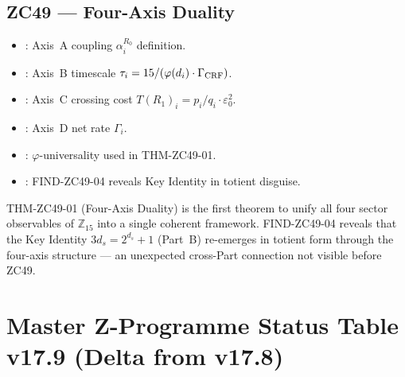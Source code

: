 \documentclass[12pt, a4paper]{article}
\begin{document}
\subsection{ZC49 --- Four-Axis Duality}

\begin{inheritbox}[title={ZC49 Backward Inheritance}]
\begin{itemize}[leftmargin=1.5em]
\item {}: Axis~A coupling
  $\alpha_i^{R_0}$ definition.
\item {}: Axis~B timescale
  $\tau_i = 15/(\varphi(d_i)\cdot\Gamma_{\rm CRF})$.
\item {}: Axis~C crossing cost
  $T(R_1)_i = p_i/q_i \cdot \varepsilon_0^2$.
\item {}: Axis~D net rate $\Gamma_i$.
\item {}: $\varphi$-universality
  used in THM-ZC49-01.
\item {}: FIND-ZC49-04 reveals Key
  Identity in totient disguise.
\end{itemize}
\end{inheritbox}

\begin{conmapbox}[title={ZC49 Synthesis Record}]
THM-ZC49-01 (Four-Axis Duality) is the first theorem to unify all four
sector observables of $\mathbb{Z}_{15}$ into a single coherent framework.
FIND-ZC49-04 reveals that the Key Identity $3d_s = 2^{d_s}+1$ (Part~B)
re-emerges in totient form through the four-axis structure --- an
unexpected cross-Part connection not visible before ZC49.
\end{conmapbox}

\section{Master Z-Programme Status Table v17.9 (Delta from v17.8)}
\label{sec:status-table-v179}
\end{document}
